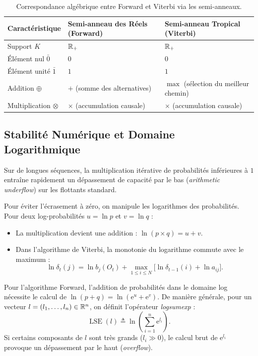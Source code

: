 \begin{table}[H]
    \centering
    \begin{tabularx}{\textwidth}{l X X}
    \hline
    \textbf{Caractéristique} & \textbf{Semi-anneau des Réels (Forward)} & \textbf{Semi-anneau Tropical (Viterbi)} \\
    \hline
    Support $K$ & $\mathbb{R}_+$ & $\mathbb{R}_+$ \\
    Élément nul $\bar{0}$ & $0$ & $0$ \\
    Élément unité $\bar{1}$ & $1$ & $1$ \\
    Addition $\oplus$ & $+$ (somme des alternatives) & $\max$ (sélection du meilleur chemin) \\
    Multiplication $\otimes$ & $\times$ (accumulation causale) & $\times$ (accumulation causale) \\
    \hline
    \end{tabularx}
    \caption{Correspondance algébrique entre Forward et Viterbi via les semi-anneaux.}
\end{table}

\subsection{Stabilité Numérique et Domaine Logarithmique}

Sur de longues séquences, la multiplication itérative de probabilités inférieures à $1$ entraîne rapidement un dépassement de capacité par le bas (\emph{arithmetic underflow}) sur les flottants standard.

Pour éviter l'écrasement à zéro, on manipule les logarithmes des probabilités. Pour deux log-probabilités $u = \ln p$ et $v = \ln q$ :
\begin{itemize}
    \item La multiplication devient une addition : $\ln(p \times q) = u + v$.
    \item Dans l'algorithme de Viterbi, la monotonie du logarithme commute avec le maximum :
    \begin{equation}
        \ln \delta_t(j) = \ln b_j(O_t) + \max_{1 \le i \le N} \big[ \ln \delta_{t-1}(i) + \ln a_{ij} \big].
    \end{equation}
\end{itemize}

Pour l'algorithme Forward, l'addition de probabilités dans le domaine log nécessite le calcul de $\ln(p + q) = \ln(\mathrm{e}^u + \mathrm{e}^v)$. De manière générale, pour un vecteur $l = (l_1, \dots, l_n) \in \mathbb{R}^n$, on définit l'opérateur \emph{logsumexp} :
\begin{equation}
    \operatorname{LSE}(l) \triangleq \ln \left( \sum_{i=1}^n \mathrm{e}^{l_i} \right).
\end{equation}
Si certains composants de $l$ sont très grands ($l_i \gg 0$), le calcul brut de $\mathrm{e}^{l_i}$ provoque un dépassement par le haut (\emph{overflow}).

